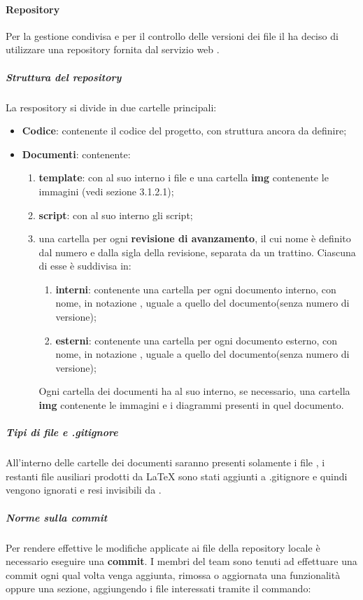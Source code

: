 	\paragraph{Repository}
	Per la gestione condivisa e per il controllo delle versioni dei file il  ha deciso di utilizzare una repository fornita dal servizio web .
		\subparagraph{Struttura del repository}
		La respository si divide in due cartelle principali:
		\begin{itemize}
			\item \textbf{Codice}: contenente il codice del progetto, con struttura ancora da definire;
			\item \textbf{Documenti}: contenente:
			\begin{enumerate}
				\item \textbf{template}: con al suo interno i file  e una cartella \textbf{img} contenente le immagini (vedi sezione 3.1.2.1);
				\item \textbf{script}: con al suo interno gli script;
				\item una cartella per ogni \textbf{revisione di avanzamento}, il cui nome è definito dal numero e dalla sigla della revisione, separata da un trattino. Ciascuna di esse è suddivisa in:
				\begin{enumerate}
					\item \textbf{interni}: contenente una cartella per ogni documento interno, con nome, in notazione , uguale a quello del documento(senza numero di versione);
					\item \textbf{esterni}: contenente una cartella per ogni documento esterno, con nome, in notazione , uguale a quello del documento(senza numero di versione);
				\end{enumerate}
				Ogni cartella dei documenti ha al suo interno, se necessario, una cartella \textbf{img} contenente le immagini e i diagrammi presenti in quel documento.
			\end{enumerate}
		\end{itemize}
		\subparagraph{Tipi di file e .gitignore}
		All'interno delle cartelle dei documenti saranno presenti solamente i file , i restanti file ausiliari prodotti da \LaTeX{} sono stati aggiunti a .gitignore e quindi vengono ignorati e resi invisibili da .
		\subparagraph{Norme sulla commit}
		Per rendere effettive le modifiche applicate ai file della repository locale è necessario eseguire una \textbf{commit}.
		I membri del team sono tenuti ad effettuare una commit ogni qual volta venga aggiunta, rimossa o aggiornata una funzionalità oppure una sezione, aggiungendo i file interessati tramite il commando:
